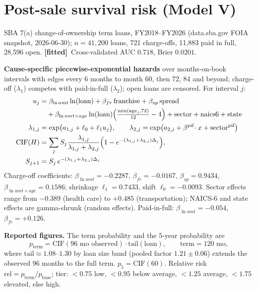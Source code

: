 \documentclass[11pt]{article}
\newcommand{\fit}{\textbf{[fitted]}}
\begin{document}
\section{Post-sale survival risk (Model V)}
SBA 7(a) change-of-ownership term loans, FY2018--FY2026 (data.sba.gov FOIA snapshot, 2026-06-30); $n=41{,}200$ loans, 721 charge-offs, 11{,}883 paid in full, 28{,}596 open. \fit\ Cross-validated AUC $0.718$, Brier $0.0201$.

\textbf{Cause-specific piecewise-exponential hazards} over months-on-book intervals with edges every 6 months to month 60, then 72, 84 and beyond; charge-off ($\lambda_1$) competes with paid-in-full ($\lambda_2$); open loans are censored. For interval $j$:
\begin{align}
u_j&=\beta_{\ln amt}\ln(\text{loan})+\beta_{fr}\,\text{franchise}+\beta_{sp}\,\text{spread}\notag\\&\quad+\beta_{\ln amt\times age}\ln(\text{loan})\Big(\tfrac{\min(\text{age}_j,72)}{12}-4\Big)+\text{sector}+\text{naics6}+\text{state}\\
\lambda_{1,j}&=\exp\!\big(a_{1,j}+\ell_0+\ell_1u_j\big),\qquad \lambda_{2,j}=\exp\!\big(a_{2,j}+\beta^{\text{pif}}\!\cdot x+\text{sector}^{\text{pif}}\big)\\
\text{CIF}(H)&=\sum_j S_j\frac{\lambda_{1,j}}{\lambda_{1,j}+\lambda_{2,j}}\Big(1-e^{-(\lambda_{1,j}+\lambda_{2,j})\Delta_j}\Big),\notag\\ S_{j+1}&=S_j\,e^{-(\lambda_{1,j}+\lambda_{2,j})\Delta_j}
\end{align}
Charge-off coefficients: $\beta_{\ln amt}=-0.2287$, $\beta_{fr}=-0.0167$, $\beta_{sp}=0.9434$, $\beta_{\ln amt\times age}=0.1586$; shrinkage $\ell_1=0.7433$, shift $\ell_0=-0.0093$. Sector effects range from $-0.389$ (health care) to $+0.485$ (transportation); NAICS-6 and state effects are gamma-shrunk (random effects). Paid-in-full: $\beta_{\ln amt}=-0.054$, $\beta_{fr}=+0.126$.

\textbf{Reported figures.} The term probability and the 5-year probability are
\begin{equation}
p_{\text{term}}=\text{CIF}(96\text{ mo observed})\cdot\text{tail}(\text{loan}),\qquad \text{term}=120\text{ mo},
\end{equation}
where $\text{tail}\approx1.08$--$1.30$ by loan size band (pooled factor $1.21\pm0.06$) extends the observed 96 months to the full term. $p_5=\text{CIF}(60)$. Relative risk $\text{rel}=p_{\text{term}}/p_{\text{base}}$; tier: $<0.75$ low, $<0.95$ below average, $<1.25$ average, $<1.75$ elevated, else high.
\end{document}
